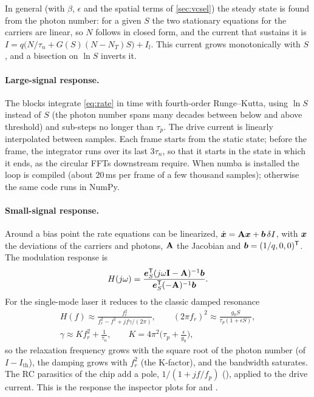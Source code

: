 In general (with $\beta$, $\epsilon$ and the spatial terms of \cref{sec:vcsel}) the steady state is found
from the photon number: for a given $S$ the two stationary equations for the carriers are linear,
so $N$ follows in closed form, and the current that sustains it is
$I=q\big(N/\tau_n+G(S)(N-N_T)S\big)+I_l$. This current grows monotonically with $S$, and a bisection on
$\ln S$ inverts it.

\paragraph{Large-signal response.} The blocks integrate \cref{eq:rate} in time with fourth-order
Runge--Kutta, using $\ln S$ instead of $S$ (the photon number spans many decades between below and
above threshold) and sub-steps no longer than $\tau_p$. The drive current is linearly interpolated
between samples. Each frame starts from the static state; before the frame, the integrator runs
over its last $3\tau_n$, so that it starts in the state in which it ends, as the circular FFTs
downstream require. When numba is installed the loop is compiled (about 20\,ms per frame of a few
thousand samples); otherwise the same code runs in NumPy.

\paragraph{Small-signal response.} Around a bias point the rate equations can be linearized,
$\dot{\bm{x}}=\mathbf{A}\bm{x}+\bm{b}\,\delta I$, with $\bm{x}$ the deviations of the carriers and photons,
$\mathbf{A}$ the Jacobian and $\bm{b}=(1/q,0,0)^{\mathsf{T}}$. The modulation response is
\begin{equation}
  H(j\omega)=\frac{\bm{e}_S^{\mathsf{T}}(j\omega\mathbf{I}-\mathbf{A})^{-1}\bm{b}}{\bm{e}_S^{\mathsf{T}}(-\mathbf{A})^{-1}\bm{b}}.
\end{equation}
For the single-mode laser it reduces to the classic damped resonance
\begin{gather}
  H(f)\approx\frac{f_r^2}{f_r^2-f^2+jf\gamma/(2\pi)},\qquad
  (2\pi f_r)^2\approx\frac{g_0S}{\tau_p(1+\epsilon S)},\\
  \gamma\approx Kf_r^2+\frac1{\tau_n},\qquad K=4\pi^2\Big(\tau_p+\frac{\epsilon}{g_0}\Big),
\end{gather}
so the relaxation frequency grows with the square root of the photon number (of $I-I_{\mathrm{th}}$), the
damping grows with $f_r^2$ (the K-factor), and the bandwidth saturates. The RC parasitics of the
chip add a pole, $1/(1+jf/f_p)$ (), applied to the drive current. This is the
response the inspector plots for  and .

